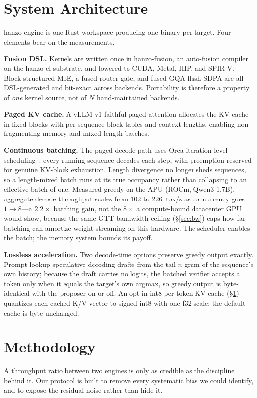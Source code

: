 \documentclass[11pt]{article}
\begin{document}
\section{System Architecture}\label{sec:arch}

hanzo-engine is one Rust workspace producing one binary per target. Four elements bear
on the measurements.

\textbf{Fusion DSL.} Kernels are written once in hanzo-fusion, an auto-fusion compiler on
the hanzo-cl substrate, and lowered to CUDA, Metal, HIP, and SPIR-V. Block-structured MoE,
a fused router gate, and fused GQA flash-SDPA are all DSL-generated and bit-exact across
backends. Portability is therefore a property of \emph{one} kernel source, not of $N$
hand-maintained backends.

\textbf{Paged KV cache.} A vLLM-v1-faithful paged attention allocates the KV cache in
fixed blocks with per-sequence block tables and context lengths, enabling non-fragmenting
memory and mixed-length batches.

\textbf{Continuous batching.} The paged decode path uses Orca iteration-level
scheduling~\cite{orca2022}: every running sequence decodes each step, with preemption
reserved for genuine KV-block exhaustion. Length divergence no longer sheds sequences,
so a length-mixed batch runs at its true occupancy rather than collapsing to an effective
batch of one. Measured greedy on the APU (ROCm, Qwen3-1.7B), aggregate decode throughput scales
from $102$ to $226$~tok/s as concurrency goes $1{\to}8$---a $2.2\times$ batching gain, not the
$8\times$ a compute-bound datacenter GPU would show, because the same GTT bandwidth ceiling
(\S\ref{sec:bw}) caps how far batching can amortize weight streaming on this hardware. The
scheduler enables the batch; the memory system bounds its payoff.

\textbf{Lossless acceleration.} Two decode-time options preserve greedy output exactly.
Prompt-lookup speculative decoding drafts from the tail $n$-gram of the sequence's own
history; because the draft carries no logits, the batched verifier accepts a token only
when it equals the target's own argmax, so greedy output is byte-identical with the
proposer on or off. An opt-in int8 per-token KV cache (\S\ref{sec:arch}) quantizes each
cached K/V vector to signed int8 with one f32 scale; the default cache is byte-unchanged.

\section{Methodology}\label{sec:method}
A throughput ratio between two engines is only as credible as the discipline behind it.
Our protocol is built to remove every systematic bias we could identify, and to expose
the residual noise rather than hide it.
\end{document}
